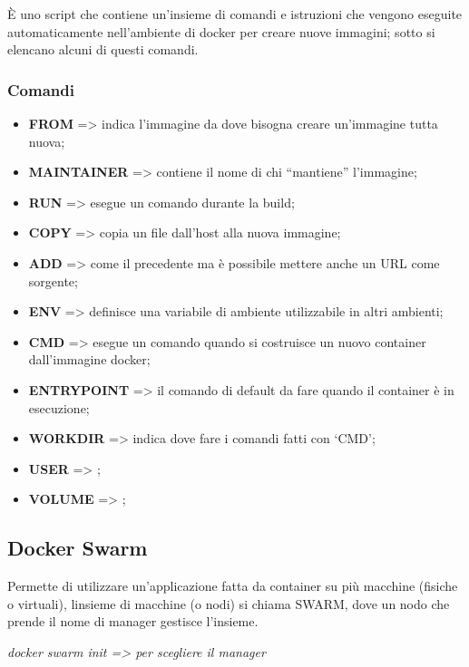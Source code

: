 È uno script che contiene un'insieme di comandi e istruzioni che vengono
eseguite automaticamente nell'ambiente di docker per creare nuove
immagini; sotto si elencano alcuni di questi comandi.

\subsubsection{Comandi}\label{comandi}

\begin{itemize}
\item
  \textbf{FROM} =\textgreater{} indica l'immagine da dove bisogna creare
  un'immagine tutta nuova;
\item
  \textbf{MAINTAINER} =\textgreater{} contiene il nome di chi
  ``mantiene'' l'immagine;
\item
  \textbf{RUN} =\textgreater{} esegue un comando durante la build;
\item
  \textbf{COPY} =\textgreater{} copia un file dall'host alla nuova
  immagine;
\item
  \textbf{ADD} =\textgreater{} come il precedente ma è possibile mettere
  anche un URL come sorgente;
\item
  \textbf{ENV} =\textgreater{} definisce una variabile di ambiente
  utilizzabile in altri ambienti;
\item
  \textbf{CMD} =\textgreater{} esegue un comando quando si costruisce un
  nuovo container dall'immagine docker;
\item
  \textbf{ENTRYPOINT} =\textgreater{} il comando di default da fare
  quando il container è in esecuzione;
\item
  \textbf{WORKDIR} =\textgreater{} indica dove fare i comandi fatti con
  `CMD';
\item
  \textbf{USER} =\textgreater{} ;
\item
  \textbf{VOLUME} =\textgreater{} ;
\end{itemize}

\subsection{Docker Swarm}\label{docker-swarm-1}

Permette di utilizzare un'applicazione fatta da container su più
macchine (fisiche o virtuali), l\textquotesingle insieme di macchine (o
nodi) si chiama SWARM, dove un nodo che prende il nome di manager
gestisce l'insieme.

\emph{docker swarm init =\textgreater{} per scegliere il manager}

